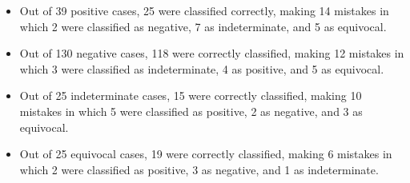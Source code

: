 \begin{itemize}[noitemsep]
    \item Out of 39 positive cases, 25 were classified correctly, making 14 mistakes in which 2 were classified as negative, 7 as indeterminate, and 5 as equivocal. 

    \item Out of 130 negative cases, 118 were correctly classified, making 12 mistakes in which 3 were classified as indeterminate, 4 as positive, and 5 as equivocal. 

    \item Out of 25 indeterminate cases, 15 were correctly classified, making 10 mistakes in which 5 were classified as positive, 2 as negative, and 3 as equivocal.
    
    \item Out of 25 equivocal cases, 19 were correctly classified, making 6 mistakes in which 2 were classified as positive, 3 as negative, and 1 as indeterminate.  
\end{itemize}





